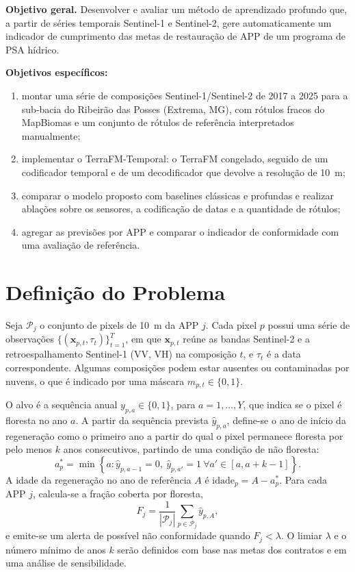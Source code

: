 \documentclass[conference]{IEEEtran}
\begin{document}
\textbf{Objetivo geral.} Desenvolver e avaliar um método de aprendizado profundo que, a partir de séries temporais Sentinel-1 e Sentinel-2, gere automaticamente um indicador de cumprimento das metas de restauração de APP de um programa de PSA hídrico.

\textbf{Objetivos específicos:}
\begin{enumerate}
\item montar uma série de composições Sentinel-1/Sentinel-2 de 2017 a 2025 para a sub-bacia do Ribeirão das Posses (Extrema, MG), com rótulos fracos do MapBiomas e um conjunto de rótulos de referência interpretados manualmente;
\item implementar o TerraFM-Temporal: o TerraFM congelado, seguido de um codificador temporal e de um decodificador que devolve a resolução de 10~m;
\item comparar o modelo proposto com baselines clássicas e profundas e realizar ablações sobre os sensores, a codificação de datas e a quantidade de rótulos;
\item agregar as previsões por APP e comparar o indicador de conformidade com uma avaliação de referência.
\end{enumerate}

\section{Definição do Problema}\label{sec:problema}

Seja $\mathcal{P}_j$ o conjunto de pixels de 10~m da APP $j$. Cada pixel $p$ possui uma série de observações $\{(\mathbf{x}_{p,t}, \tau_t)\}_{t=1}^{T}$, em que $\mathbf{x}_{p,t}$ reúne as bandas Sentinel-2 e a retroespalhamento Sentinel-1 (VV, VH) na composição $t$, e $\tau_t$ é a data correspondente. Algumas composições podem estar ausentes ou contaminadas por nuvens, o que é indicado por uma máscara $m_{p,t} \in \{0,1\}$.

O alvo é a sequência anual $y_{p,a} \in \{0,1\}$, para $a = 1,\dots,Y$, que indica se o pixel é floresta no ano $a$. A partir da sequência prevista $\hat{y}_{p,a}$, define-se o ano de início da regeneração como o primeiro ano a partir do qual o pixel permanece floresta por pelo menos $k$ anos consecutivos, partindo de uma condição de não floresta:
\begin{equation}
a^{*}_p = \min\left\{a : \hat{y}_{p,a-1}=0,\ \hat{y}_{p,a'}=1\ \forall a' \in [a, a+k-1]\right\}.\label{eq:inicio}
\end{equation}
A idade da regeneração no ano de referência $A$ é $\mathrm{idade}_p = A - a^{*}_p$. Para cada APP $j$, calcula-se a fração coberta por floresta,
\begin{equation}
F_j = \frac{1}{|\mathcal{P}_j|}\sum_{p\in\mathcal{P}_j}\hat{y}_{p,A},\label{eq:conformidade}
\end{equation}
e emite-se um alerta de possível não conformidade quando $F_j < \lambda$. O limiar $\lambda$ e o número mínimo de anos $k$ serão definidos com base nas metas dos contratos e em uma análise de sensibilidade.
\end{document}
